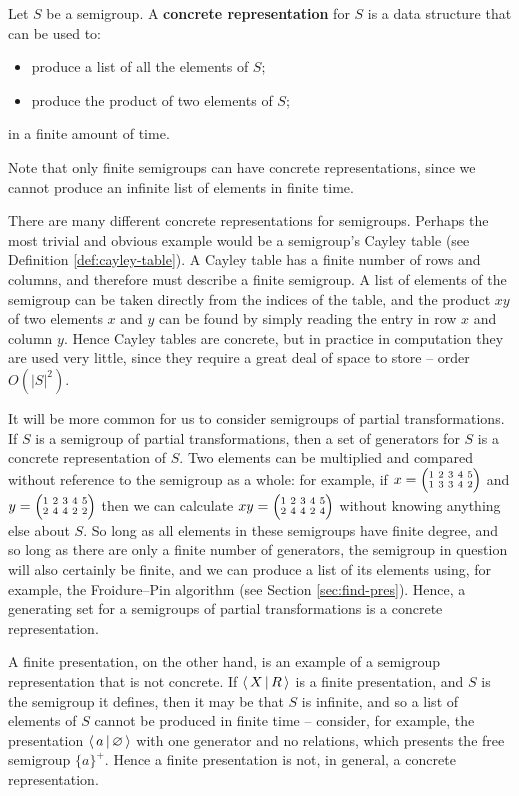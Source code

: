 \begin{definition}
  \label{def:concrete}
  Let $S$ be a semigroup.
  A \textbf{concrete representation} for $S$ is a data structure that can be
  used to:
  \begin{itemize}
  \item produce a list of all the elements of $S$;
  \item produce the product of two elements of $S$;
  \end{itemize}
  in a finite amount of time.
\end{definition}

Note that only finite semigroups can have concrete representations, since we
cannot produce an infinite list of elements in finite time.

There are many different concrete representations for semigroups.  Perhaps the
most trivial and obvious example would be a semigroup's Cayley table (see
Definition \ref{def:cayley-table}).  A Cayley table has a finite number of
rows and columns, and therefore must describe a finite semigroup.  A list of
elements of the semigroup can be taken directly from the indices of the table,
and the product $xy$ of two elements $x$ and $y$ can be found by simply reading
the entry in row $x$ and column $y$.  Hence Cayley tables are concrete, but in
practice in computation they are used very little, since they require a great
deal of space to store -- order $O(|S|^2)$.

It will be more common for us to consider semigroups of partial transformations.
If $S$ is a semigroup of partial transformations, then a set of generators for
$S$ is a concrete representation of $S$.  Two elements can be multiplied and
compared without reference to the semigroup as a whole: for example, if
$x = \transV 13342$ and $y = \transV 24422$ then we can calculate
$xy = \transV 24424$ without knowing anything else about $S$.  So long as all
elements in these semigroups have finite degree, and so long as there are only a
finite number of generators, the semigroup in question will also certainly be
finite, and we can produce a list of its elements using, for example, the
Froidure--Pin algorithm (see Section \ref{sec:find-pres}).  Hence, a
generating set for a semigroups of partial transformations is a concrete
representation.

A finite presentation, on the other hand, is an example of a semigroup
representation that is not concrete.  If $\left\langle \, X \, \middle| \, R \, \right\rangle$ is a finite presentation,
and $S$ is the semigroup it defines, then it may be that $S$ is infinite, and so
a list of elements of $S$ cannot be produced in finite time -- consider, for
example, the presentation $\left\langle \, a \, \middle| \, \varnothing \, \right\rangle$ with one generator and no
relations, which presents the free semigroup $\{a\}^+$.  Hence a finite
presentation is not, in general, a concrete representation.

